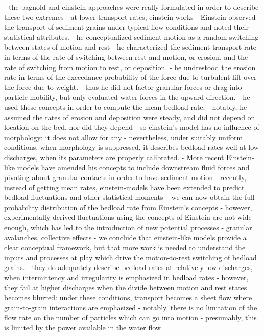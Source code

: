 \documentclass{article}
\begin{document}
- the bagnold and einstein approaches were really formulated in order to describe these two extremes
- at lower transport rates, einstein works 
- Einstein observed the transport of sediment grains under typical flow conditions and noted their statistical attributes. 
- he conceptualized sediment motion as a random switching between states of motion and rest
- he characterized the sediment transport rate in terms of the rate of switching between rest and motion, or erosion, and the rate of switching from motion to rest, or deposition. 
- he undrestood the erosion rate in terms of the exceedance probability of the force due to turbulent lift over the force due to weight. 
- thus he did not factor granular forces or drag into particle mobility, but only evaluated water forces in the upward direction. 
- he used these concepts in order to compute the mean bedload rate; 
- notably, he assumed the rates of erosion and deposition were steady, and did not depend on location on the bed, nor did they depend 
- so einstein's model has no influence of morphology: it does not allow for any 
- nevertheless, under suitably uniform conditions, when morphology is suppressed, it describes bedload rates well at low discharges, when its parameters are properly calibrated. 
- More recent Einstein-like models have amended his concepts to include downstream fluid forces and pivoting about granular contacts in order to have sediment motion
- recently, instead of getting mean rates, einstein-models have been extended to predict bedload fluctuations and other statistical moments -- we can now obtain the full probability distribution of the bedload rate from Einstein's concepts
- however, experimentally derived fluctuations using the concepts of Einstein are not wide enough, which has led to the introduction of new potential processes
- granular avalanches, collective effects
- we conclude that einstein-like models provide a clear conceptual framework, but that more work is needed to understand the inputs and processes at play which drive the motion-to-rest switching of bedload grains. 
- they do adequately describe bedload rates at relatively low discharges, when intermittency and irregularity is emphasized in bedload rates
- however, they fail at higher discharges when the divide between motion and rest states becomes blurred: under these conditions, transport becomes a sheet flow where grain-to-grain interactions are emphasized
- notably, there is no limitation of the flow rate on the number of particles which can go into motion
- presumably, this is limited by the power available in the water flow 
\end{document}

